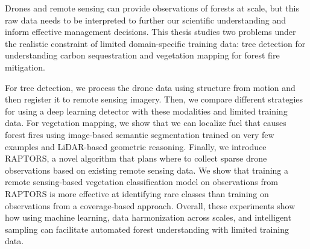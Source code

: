 
\setlength{\parskip}{1em}
\setlength{\parindent}{0em}
Drones and remote sensing can provide observations of forests at scale, but this raw data needs to be interpreted to further our scientific understanding and inform effective management decisions. This thesis studies two problems under the realistic constraint of limited domain-specific training data: tree detection for understanding carbon sequestration and vegetation mapping for forest fire mitigation.

For tree detection, we process the drone data using structure from motion and then register it to remote sensing imagery. Then, we compare different strategies for using a deep learning detector with these modalities and limited training data.
For vegetation mapping, we show that we can localize fuel that causes forest fires using image-based semantic segmentation trained on very few examples and LiDAR-based geometric reasoning. Finally, we introduce RAPTORS, a novel algorithm that plans where to collect sparse drone observations based on existing remote sensing data. We show that training a remote sensing-based vegetation classification model on observations from RAPTORS is more effective at identifying rare classes than training on observations from a coverage-based approach. 
Overall, these experiments show how using machine learning, data harmonization across scales, and intelligent sampling can facilitate automated forest understanding with limited training data.


